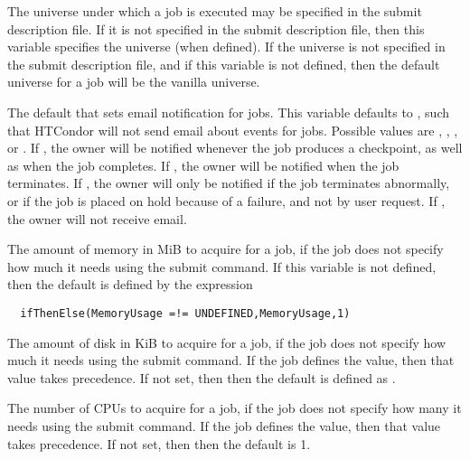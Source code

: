 \begin{description}
\label{param:DefaultUniverse}
\item[\Macro{DEFAULT\_UNIVERSE}]
  The universe under which a job is executed may be specified in the submit
  description file.
  If it is not specified in the submit description file, then
  this variable specifies the universe (when defined).
  If the universe is not specified in the submit description
  file, and if this variable is not defined, then
  the default universe for a job will be the vanilla universe.

\label{param:JobDefaultNotification}
\item[\Macro{JOB\_DEFAULT\_NOTIFICATION}]
  The default that sets email notification for jobs. 
  This variable defaults to ,
  such that HTCondor will not send email about events for jobs. 
  Possible values are
  , , , or . 
  If , the owner will be notified whenever the job produces a
  checkpoint, as well as when the job completes. 
  If , the owner will be notified when the job terminates.
  If , the owner
  will only be notified if the job terminates abnormally, 
  or if the job is placed on hold because of a failure, 
  and not by user request. 
  If , the owner will not receive email. 

\label{param:JobDefaultRequestMemory}
\item[\Macro{JOB\_DEFAULT\_REQUESTMEMORY}]
  The amount of memory in MiB to acquire for a job, 
  if the job does not specify how much it needs using the 
   submit command.
  If this variable is not defined, then the default is defined by
  the expression
\begin{verbatim}
  ifThenElse(MemoryUsage =!= UNDEFINED,MemoryUsage,1)
\end{verbatim}

\label{param:JobDefaultRequestDisk}
\item[\Macro{JOB\_DEFAULT\_REQUESTDISK}]
  The amount of disk in  KiB to acquire for a job,
  if the job does not specify how much it needs using the 
   submit command.
  If the job defines the value, then that value takes precedence. 
  If not set, then then the default is defined as .

\label{param:JobDefaultRequestCpus}
\item[\Macro{JOB\_DEFAULT\_REQUESTCPUS}]
  The number of CPUs to acquire for a job,
  if the job does not specify how many it needs using the 
   submit command.
  If the job defines the value, then that value takes precedence. 
  If not set, then then the default is 1.

\end{description}

